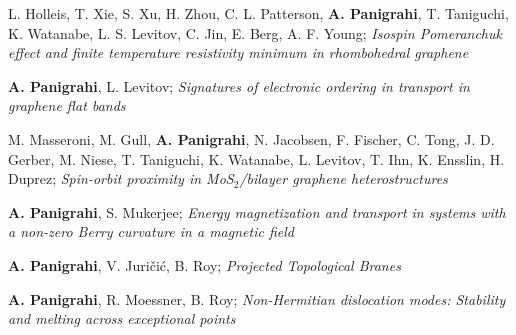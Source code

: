 

\begin{cventries}

  \cventry
    {} %
    {} %
    {} %
    {} %
    {
	  \begin{cvitems} %
	  	\item{L. Holleis, T. Xie, S. Xu, H. Zhou, C. L. Patterson, \textbf{A. Panigrahi}, T. Taniguchi, K. Watanabe, L. S. Levitov, C. Jin, E. Berg, A. F. Young; \textit{Isospin Pomeranchuk effect and finite temperature resistivity minimum in rhombohedral graphene}
	  	 }
	  	\item{\textbf{A. Panigrahi}, L. Levitov; \textit{Signatures of electronic ordering in transport in graphene flat bands} }
	  	\item{M. Masseroni, M. Gull, \textbf{A. Panigrahi}, N. Jacobsen, F. Fischer, C. Tong, J. D. Gerber, M. Niese, T. Taniguchi, K. Watanabe, L. Levitov, T. Ihn, K. Ensslin, H. Duprez; \textit{Spin-orbit proximity in MoS$_2$/bilayer graphene heterostructures}
	  	} %
	  	\item{\textbf{A. Panigrahi}, S. Mukerjee; \textit{Energy magnetization and transport in systems with a non-zero Berry curvature in a magnetic field}
	  	}
	  	\item{\textbf{A. Panigrahi}, V. Juri\v{c}i\'c, B. Roy; \textit{Projected Topological Branes}}
      	\item{\textbf{A. Panigrahi}, R. Moessner, B. Roy; \textit{Non-Hermitian dislocation modes: Stability and melting across exceptional points} }
      \end{cvitems}
    }


\end{cventries}
